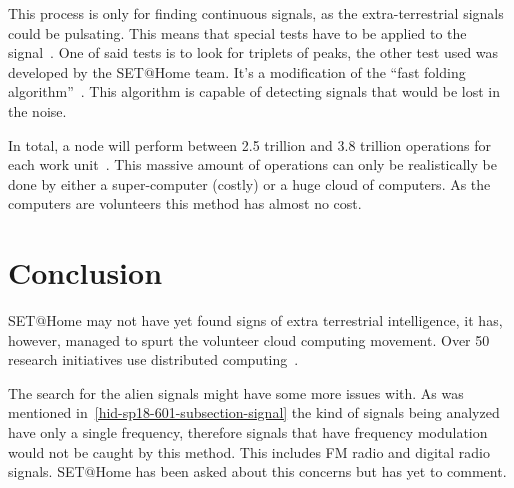 This process is only for finding continuous signals, as the extra-terrestrial 
signals could be pulsating. This means that special tests have to be applied 
to the signal~\cite{hid-sp18-601-www-sathome-howworks}. One of said tests is 
to look for triplets of peaks, the other test
used was developed by the SET$@$Home team. It's a modification of the 
``fast folding algorithm''~\cite{hid-sp18-601-paper-korpela2001seti}.
This algorithm is capable of detecting signals that would be lost in the noise.

In total, a node will perform between 2.5 trillion and 3.8 trillion operations 
for each work unit~\cite{hid-sp18-601-www-sathome-howworks}. 
This massive amount of operations can only be realistically 
be done by either a super-computer (costly) or a huge cloud of computers. As the
 computers are volunteers this method has almost no cost.

\section{Conclusion}\label{hid-sp18-601-section-conclusions}

SET$@$Home may not have yet found signs of extra terrestrial intelligence, it 
has, however, managed to spurt the volunteer cloud computing movement. Over 50
research initiatives use distributed 
computing~\cite{hid-sp18-601-www-boinc-projects}.

The search for the alien signals might have some more issues with. As was 
mentioned in~\ref{hid-sp18-601-subsection-signal} the kind of signals being 
analyzed have only a single frequency, therefore signals that have frequency 
modulation would not be caught by this method. This includes FM radio and 
digital radio signals. SET$@$Home has been asked about this concerns but has 
yet to comment.


\begin{acks}

\end{acks}


 

